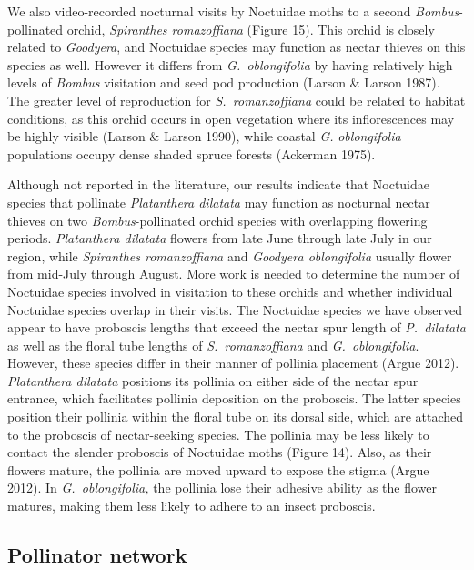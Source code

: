 \begin{multicols}{2}
We also video-recorded nocturnal visits by Noctuidae moths to a second
\emph{Bombus}-pollinated orchid, \emph{Spiranthes romazoffiana} (Figure
15). This orchid is closely related to \emph{Goodyera}, and Noctuidae
species may function as nectar thieves on this species as well. However
it differs from \emph{G.\ oblongifolia} by having relatively high levels
of \emph{Bombus} visitation and seed pod production (Larson \& Larson
1987). The greater level of reproduction for \emph{S.\ romanzoffiana} could be related to habitat conditions, as this
orchid occurs in open vegetation where its inflorescences may be highly
visible (Larson \& Larson 1990), while coastal \emph{G.}
\emph{oblongifolia} populations occupy dense shaded spruce forests
(Ackerman 1975).

Although not reported in the literature, our results indicate that
Noctuidae species that pollinate \emph{Platanthera dilatata} may
function as nocturnal nectar thieves on two \emph{Bombus}-pollinated
orchid species with overlapping flowering periods. \emph{Platanthera
dilatata} flowers from late June through late July in our region, while
\emph{Spiranthes romanzoffiana} and \emph{Goodyera oblongifolia} usually
flower from mid-July through August. More work is needed to determine
the number of Noctuidae species involved in visitation to these orchids
and whether individual Noctuidae species overlap in their visits. The
Noctuidae species we have observed appear to have proboscis lengths that
exceed the nectar spur length of \emph{P.\ dilatata} as well as the
floral tube lengths of \emph{S.\ romanzoffiana} and \emph{G.\
oblongifolia}. However, these species differ in their manner of pollinia
placement (Argue 2012). \emph{Platanthera dilatata} positions its
pollinia on either side of the nectar spur entrance, which facilitates
pollinia deposition on the proboscis. The latter species position their
pollinia within the floral tube on its dorsal side, which are attached
to the proboscis of nectar-seeking species. The pollinia may be less
likely to contact the slender proboscis of Noctuidae moths (Figure 14).
Also, as their flowers mature, the pollinia are moved upward to expose
the stigma (Argue 2012). In \emph{G.\ oblongifolia,} the pollinia lose
their adhesive ability as the flower matures, making them less likely to
adhere to an insect proboscis.

\subsection{Pollinator network}


\end{multicols}
